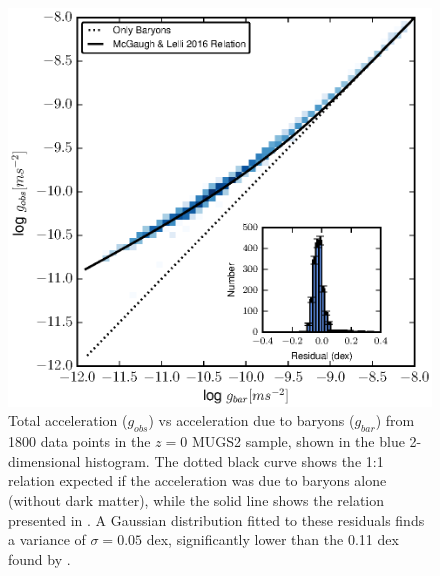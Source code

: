 \begin{figure}
    \includegraphics[width=\textwidth]{figures4/SPARC_plot.eps}
    \caption[Total acceleration vs. baryonic acceleration in MUGS2]{Total
    acceleration ($g_{obs}$) vs acceleration due to baryons ($g_{bar}$) from
    1800 data points in the $z=0$ MUGS2 sample, shown in the blue 2-dimensional
    histogram.  The dotted black curve shows the 1:1 relation expected if the
    acceleration was due to baryons alone (without dark matter), while the solid
    line shows the relation presented in \citet{McGaugh2016}.  A Gaussian
    distribution fitted to these residuals finds a variance of $\sigma=0.05$
    dex, significantly lower than the 0.11 dex found by \citet{McGaugh2016}.}
    \label{SPARC_plot}
\end{figure}
